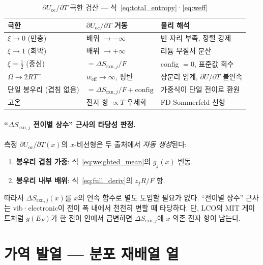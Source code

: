 \documentclass[11pt,a4paper]{article}
\newcommand{\rxn}{\mathrm{rxn}}
\newcommand{\oc}{\mathrm{oc}}
\newcommand{\eff}{\mathrm{eff}}
\begin{document}
\begin{table}[h]
\centering\small\renewcommand{\arraystretch}{1.3}
\caption{$\partial U_{\oc}/\partial T$ 극한 검산 --- 식~\eqref{eq:total_entropy}·\eqref{eq:weff}}
\label{tab:limits}
\begin{tabular}{lll}
\toprule
극한 & $\partial U_{\oc}/\partial T$ 거동 & 물리 해석 \\
\midrule
$\xi\to0$ (만충) & 배위 $\to-\infty$ & 빈 자리 부족, 정렬 강제 \\
$\xi\to1$ (희박) & 배위 $\to+\infty$ & 리튬 무질서 분산 \\
$\xi=\frac{1}{2}$ (중심) & $=\Delta S_{\rxn,j}/F$ & config $=0$, 표준값 회수 \\
$\Omega\to2RT^-$ & $w_{\eff}\to\infty$, 평탄 & 상분리 임계, $\partial U/\partial T$ 불연속 \\
단일 봉우리 (겹침 없음) & $=\Delta S_{\rxn,j}/F+\text{config}$ & 가중식이 단일 전이로 환원 \\
고온 & 전자 항 $\propto T$ 우세화 & FD Sommerfeld 선형 \\
\bottomrule
\end{tabular}
\end{table}

\paragraph{``$\Delta S_{\rxn,j}$ 전이별 상수'' 근사의 타당성 판정.}
측정 $\partial U_{\oc}/\partial T(x)$의 $x$-비선형은 두 출처에서 \emph{자동 생성}된다:
\begin{enumerate}[leftmargin=1.8em,itemsep=2pt]
  \item \textbf{봉우리 겹침 가중}: 식~\eqref{eq:weighted_mean}의 $g_j(x)$ 변동.
  \item \textbf{봉우리 내부 배위}: 식~\eqref{eq:full_deriv}의 $z_jR/F$ 항.
\end{enumerate}
따라서 $\Delta S_{\rxn,j}(x)$를 $x$의 연속 함수로 별도 도입할 필요가 없다.
``전이별 상수'' 근사는 vib·electronic이 전이 폭 내에서 천천히 변할 때 타당하다.
단, LCO의 MIT 게이트처럼 $g(E_F)$가 한 전이 안에서 급변하면
$\Delta S_{\rxn,j}$에 $x$-의존 전자 항이 남는다.

\section{가역 발열 --- 분포 재배열 열}\label{sec:qrev}
\end{document}
